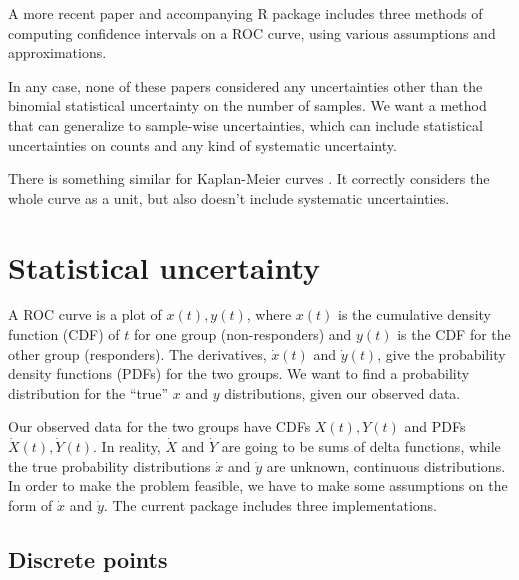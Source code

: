 \documentclass[11pt]{article}
\newcommand{\xdot}{\dot{x}}
\newcommand{\ydot}{\dot{y}}
\newcommand{\Xdot}{\dot{X}}
\newcommand{\Ydot}{\dot{Y}}
\begin{document}
A more recent paper and accompanying R package \autocite{roc_fernandez} includes three methods of computing confidence intervals on a ROC curve, using various assumptions and approximations.

In any case, none of these papers considered any uncertainties other than the binomial statistical uncertainty on the number of samples.  We want a method that can generalize to sample-wise uncertainties, which can include statistical uncertainties on counts and any kind of systematic uncertainty.

There is something similar for Kaplan-Meier curves \autocite{kaplanmeier_sachs}.  It correctly considers the whole curve as a unit, but also doesn't include systematic uncertainties.

\section{Statistical uncertainty}
\label{sec:stat}

A ROC curve is a plot of \(x(t), y(t)\), where \(x(t)\) is the cumulative density function (CDF) of \(t\) for one group (non-responders) and \(y(t)\) is the CDF for the other group (responders).  The derivatives, \(\xdot(t)\) and \(\ydot(t)\), give the probability density functions (PDFs) for the two groups.   We want to find a probability distribution for the ``true'' \(x\) and \(y\) distributions, given our observed data.

Our observed data for the two groups have CDFs \(X(t), Y(t)\) and PDFs \(\Xdot(t), \Ydot(t)\).  In reality, \(\Xdot\) and \(\Ydot\) are going to be sums of delta functions, while the true probability distributions \(\xdot\) and \(\ydot\) are unknown, continuous distributions.  In order to make the problem feasible, we have to make some assumptions on the form of \(\xdot\) and \(\ydot\).  The current package includes three implementations.

\subsection{Discrete points}
\label{sec:discrete}
\end{document}
